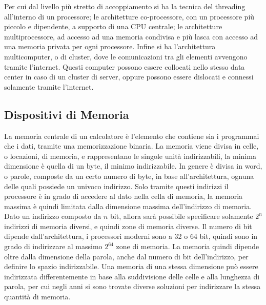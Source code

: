\documentclass{article}
\numberwithin{equation}{subsection}
\begin{document}
Per cui dal livello più stretto di accoppiamento si ha la tecnica del threading all'interno di un processore; le architetture co-processore, con un processore più piccolo e dipendente, a supporto di una CPU centrale; 
le architetture multiprocessore, ad accesso ad una memoria condivisa e più lasca con accesso ad una memoria privata per ogni processore. Infine si ha l'architettura multicomputer, o di cluster, dove le comunicazioni 
tra gli elementi avvengono tramite l'internet. Questi computer possono essere collocati nello stesso data center in caso di un cluster di server, oppure possono essere dislocati e connessi solamente tramite l'internet. 

\subsection{Dispositivi di Memoria}

La memoria centrale di un calcolatore è l'elemento che contiene sia i programmai che i dati, tramite una memorizzazione binaria. La memoria viene divisa in celle, o locazioni, di memoria, e rappresentano le singole 
unità indirizzabili, la minima dimensione è quella di un byte, il minimo indirizzabile. In genere è divisa in word, o parole, composte da un certo numero di byte, in base all'architettura, ognuna delle quali 
possiede un univoco indirizzo. Solo tramite questi indirizzi il processore è in grado di accedere al dato nella cella di memoria, la memoria massima è quindi limitata dalla dimensione massima dell'indirizzo di 
memoria. Dato un indirizzo composto da $n$ bit, allora sarà possibile specificare solamente $2^n$ indirizzi di memoria diversi, e quindi zone di memoria diverse. Il numero di bit dipende dall'architettura, i processori 
moderni sono a 32 o 64 bit, quindi sono in grado di indirizzare al massimo $2^{64}$ zone di memoria. 
La memoria quindi dipende oltre dalla dimensione della parola, anche dal numero di bit dell'indirizzo, per definire lo spazio indirizzabile. Una memoria di una stessa dimensione può essere indirizzata 
differentemente in base alla suddivisione delle celle e alla lunghezza di parola, per cui negli anni si sono trovate diverse soluzioni per indirizzare la stessa quantità di memoria. 
\end{document}
